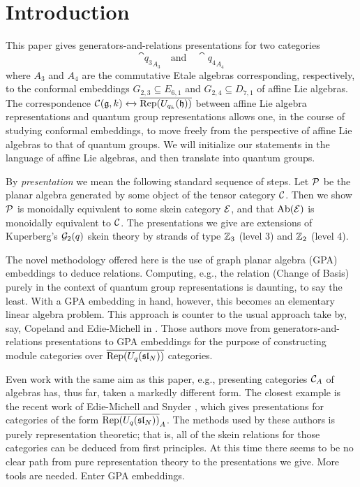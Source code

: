 \section{Introduction}

This paper gives generators-and-relations presentations for two categories 
\[
    \cat{q_3}_{A_3} \quad \text{and} \quad \cat{q_4}_{A_4}
\] 
where $A_3$ and $A_4$ are the commutative Etale algebras corresponding, respectively, 
to the conformal embeddings $G_{2,3} \subseteq E_{6,1}$ and $G_{2,4} \subseteq D_{7,1}$ 
of affine Lie algebras. 
The correspondence $\mathcal{C}(\mathfrak{g},k) \xleftrightarrow{} \overline{\operatorname{Rep}(U_{q_k}(\mathfrak{h}))}$ between 
affine Lie algebra representations and quantum group representations  allows one, 
in the course of studying conformal embeddings, to move freely from the perspective of 
affine Lie algebras to that of quantum groups. 
We will initialize our statements in the language of affine Lie algebras, 
and then translate into quantum groups.

By {\it presentation} we mean the following standard sequence of steps. 
Let $\mathcal{P}$ be the planar algebra generated by some object of the tensor category $\mathcal{C}$. 
Then we show $\mathcal{P}$ is monoidally equivalent to some skein category $\mathcal{E}$, and that $\operatorname{Ab}(\mathcal{E})$ is monoidally equivalent to $\mathcal{C}$. 
The presentations we give are extensions of Kuperberg's $\mathcal{G}_2(q)$ skein theory by strands of type $\mathbb{Z}_3$ (level 3) and $\mathbb{Z}_2$ (level 4). 

The novel methodology offered here is the use of graph planar algebra (GPA) embeddings to deduce relations. 
Computing, e.g., the relation (Change of Basis) purely in the context of quantum group representations is daunting, to say the least. 
With a GPA embedding in hand, however, this becomes an elementary linear algebra problem. 
This approach is counter to the usual approach take by, say, Copeland and Edie-Michell in \cite{Cain_Dan}.
Those authors move from generators-and-relations presentations to GPA embeddings for the purpose of 
constructing module categories over $\overline{\operatorname{Rep}(U_q(\mathfrak{sl}_N))}$ categories.

Even work with the same aim as this paper, e.g., presenting categories $\mathcal{C}_A$ of algebras has, thus far,
taken a markedly different form.
The closest example is the recent work of Edie-Michell and Snyder \cite{cain_noah_hans}, which gives presentations 
for categories of the form $\overline{\operatorname{Rep}(U_q(\mathfrak{sl}_N))}_A$.
The methods used by these authors is purely representation theoretic;
that is, all of the skein relations for those categories can be deduced from first principles.
At this time there seems to be no clear path from pure representation theory to the presentations we give.
More tools are needed.
Enter GPA embeddings.

